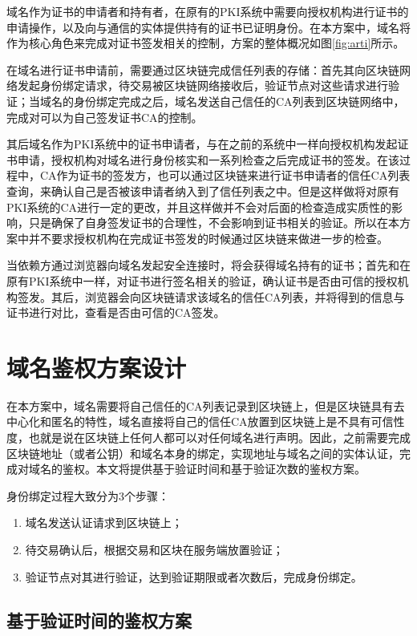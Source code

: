 域名作为证书的申请者和持有者，在原有的PKI系统中需要向授权机构进行证书的申请操作，以及向与通信的实体提供持有的证书已证明身份。在本方案中，域名将作为核心角色来完成对证书签发相关的控制，方案的整体概况如图\ref{fig:arti}所示。

在域名进行证书申请前，需要通过区块链完成信任列表的存储：首先其向区块链网络发起身份绑定请求，待交易被区块链网络接收后，验证节点对这些请求进行验证；当域名的身份绑定完成之后，域名发送自己信任的CA列表到区块链网络中，完成对可以为自己签发证书CA的控制。

其后域名作为PKI系统中的证书申请者，与在之前的系统中一样向授权机构发起证书申请，授权机构对域名进行身份核实和一系列检查之后完成证书的签发。在该过程中，CA作为证书的签发方，也可以通过区块链来进行证书申请者的信任CA列表查询，来确认自己是否被该申请者纳入到了信任列表之中。但是这样做将对原有PKI系统的CA进行一定的更改，并且这样做并不会对后面的检查造成实质性的影响，只是确保了自身签发证书的合理性，不会影响到证书相关的验证。所以在本方案中并不要求授权机构在完成证书签发的时候通过区块链来做进一步的检查。

当依赖方通过浏览器向域名发起安全连接时，将会获得域名持有的证书；首先和在原有PKI系统中一样，对证书进行签名相关的验证，确认证书是否由可信的授权机构签发。其后，浏览器会向区块链请求该域名的信任CA列表，并将得到的信息与证书进行对比，查看是否由可信的CA签发。


\section{域名鉴权方案设计}

在本方案中，域名需要将自己信任的CA列表记录到区块链上，但是区块链具有去中心化和匿名的特性，域名直接将自己的信任CA放置到区块链上是不具有可信性度，也就是说在区块链上任何人都可以对任何域名进行声明。因此，之前需要完成区块链地址（或者公钥）和域名本身的绑定，实现地址与域名之间的实体认证，完成对域名的鉴权。本文将提供基于验证时间和基于验证次数的鉴权方案。

身份绑定过程大致分为3个步骤：

\begin{enumerate}
	\item 域名发送认证请求到区块链上；
	\item 待交易确认后，根据交易和区块在服务端放置验证；
	\item 验证节点对其进行验证，达到验证期限或者次数后，完成身份绑定。
\end{enumerate}

\subsection{基于验证时间的鉴权方案}

